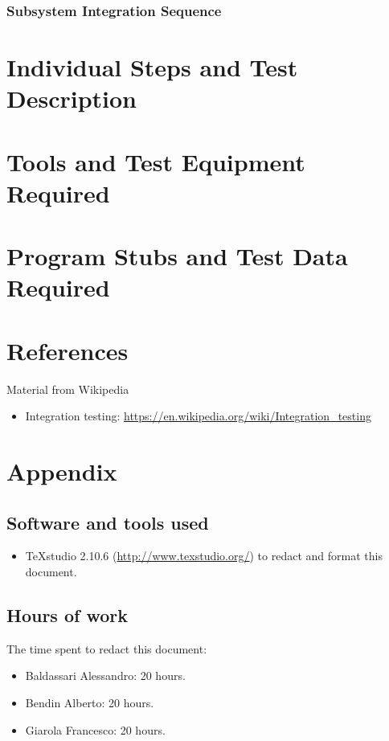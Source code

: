 \documentclass[a4paper,11pt]{report} %
\begin{document}
	\subsubsection{Subsystem Integration Sequence}
	
	
	\section{Individual Steps and Test Description}
	
	
	\section{Tools and Test Equipment Required}
	
	
	\section{Program Stubs and Test Data Required}
	
	\section{References}
		Material from Wikipedia
		\begin{itemize}
			\item Integration testing: \href{https://en.wikipedia.org/wiki/Integration_testing}{https://en.wikipedia.org/wiki/Integration\_testing}
		\end{itemize}
	
	\section{Appendix}
	
	\subsection{Software and tools used}
	\begin{itemize}
		\item TeXstudio 2.10.6 (\href{http://www.texstudio.org/}{http://www.texstudio.org/}) to redact and format this document.
	\end{itemize}
	
	\subsection{Hours of work} The time spent to redact this document:
	\begin{itemize}
		\item Baldassari Alessandro: 20 hours.
		\item Bendin Alberto: 20 hours.
		\item Giarola Francesco: 20 hours.
	\end{itemize}
\end{document}
